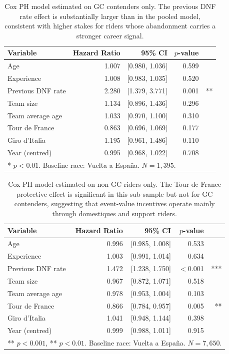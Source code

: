 \begin{table}[H]
\centering
\caption{Cox PH model estimated on GC contenders only. The previous DNF rate effect is substantially larger than in the pooled model, consistent with higher stakes for riders whose abandonment carries a stronger career signal.}
\label{tab:cox_gc}
\small
\renewcommand{\arraystretch}{1.3}
\begin{tabular}{@{} lrrrr @{}}
\toprule
Variable & Hazard Ratio & 95\% CI & $p$-value & \\
\midrule
Age                 & 1.007 & [0.980, 1.036] & 0.599 & \\
Experience          & 1.008 & [0.983, 1.035] & 0.520 & \\
Previous DNF rate   & 2.280 & [1.379, 3.771] & 0.001 & ** \\
Team size           & 1.134 & [0.896, 1.436] & 0.296 & \\
Team average age    & 1.033 & [0.970, 1.100] & 0.310 & \\
Tour de France      & 0.863 & [0.696, 1.069] & 0.177 & \\
Giro d'Italia       & 1.195 & [0.961, 1.486] & 0.110 & \\
Year (centred)      & 0.995 & [0.968, 1.022] & 0.708 & \\
\bottomrule
\multicolumn{5}{l}{\footnotesize ** $p<0.01$. Baseline race: Vuelta a Espa\~{n}a. $N = 1{,}395$.}
\end{tabular}
\end{table}

\begin{table}[H]
\centering
\caption{Cox PH model estimated on non-GC riders only. The Tour de France protective effect is significant in this sub-sample but not for GC contenders, suggesting that event-value incentives operate mainly through domestiques and support riders.}
\label{tab:cox_nonGC}
\small
\renewcommand{\arraystretch}{1.3}
\begin{tabular}{@{} lrrrr @{}}
\toprule
Variable & Hazard Ratio & 95\% CI & $p$-value & \\
\midrule
Age                 & 0.996 & [0.985, 1.008] & 0.533 & \\
Experience          & 1.003 & [0.991, 1.014] & 0.634 & \\
Previous DNF rate   & 1.472 & [1.238, 1.750] & $<$0.001 & *** \\
Team size           & 0.967 & [0.872, 1.071] & 0.518 & \\
Team average age    & 0.978 & [0.953, 1.004] & 0.103 & \\
Tour de France      & 0.866 & [0.784, 0.957] & 0.005 & ** \\
Giro d'Italia       & 1.041 & [0.948, 1.144] & 0.398 & \\
Year (centred)      & 0.999 & [0.988, 1.011] & 0.915 & \\
\bottomrule
\multicolumn{5}{l}{\footnotesize *** $p<0.001$, ** $p<0.01$. Baseline race: Vuelta a Espa\~{n}a. $N = 7{,}650$.}
\end{tabular}
\end{table}

